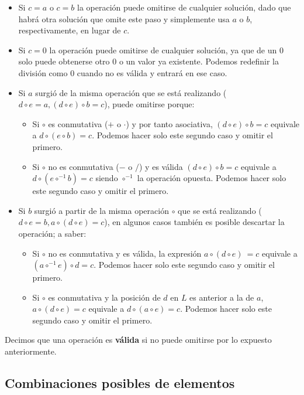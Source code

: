 \begin{itemize}
	\item Si $c = a$ o $c = b$ la operación puede omitirse de cualquier solución,
	dado que habrá otra solución que omite este paso y simplemente usa $a$ o $b$, respectivamente, en lugar de $c$.
	\item Si $c = 0$ la operación puede omitirse de cualquier solución, ya que de
	un 0 solo puede obtenerse otro 0 o un valor ya existente. Podemos redefinir
	la división como 0 cuando no es válida y entrará en ese caso.
	\item Si $a$ surgió de la misma operación que se está realizando
  ($d \circ e = a, (d \circ e) \circ b = c$),
  puede omitirse porque:
	\begin{itemize}
		\item Si $\circ$ es conmutativa ($+$ o $\cdot$) y por tanto asociativa,
		$(d \circ e) \circ b = c$ equivale a $d \circ (e \circ b) = c$.
		Podemos hacer solo este segundo caso y omitir el primero.
		\item Si $\circ$ no es conmutativa ($-$ o $/$) y es válida
		$(d \circ e) \circ b = c$ equivale a $d \circ (e \circ^{-1} b) = c$
		siendo $\circ^{-1}$ la operación opuesta. Podemos hacer solo este segundo caso y omitir el primero.
	\end{itemize}
	\item Si $b$ surgió a partir de la misma operación $\circ$ que se está realizando
	($d \circ e = b, a \circ (d \circ e) = c$),
	en algunos casos también es posible descartar la operación; a saber:
	\begin{itemize}
		\item Si $\circ$ no es conmutativa y es válida, la expresión
		$a \circ (d \circ e)\ = c$ equivale a $(a \circ^{-1} e) \circ d = c$.
		Podemos hacer solo este segundo caso y omitir el primero.
		\item Si $\circ$ es conmutativa y la posición de $d$ en $L$ es anterior a la de $a$, $a \circ (d \circ e) = c$	equivale a $d \circ (a \circ e) = c$.
		Podemos hacer solo este segundo caso y omitir el primero.
	\end{itemize}
\end{itemize}

Decimos que una operación es \textbf{válida} si no puede omitirse por lo
expuesto anteriormente.

\subsection{Combinaciones posibles de elementos}

